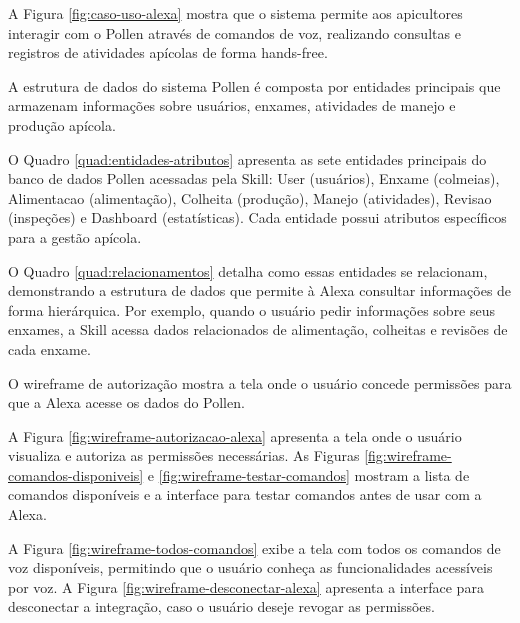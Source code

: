 

A Figura \ref{fig:caso-uso-alexa} mostra que o sistema permite aos apicultores interagir com o Pollen através de comandos de voz, realizando consultas e registros de atividades apícolas de forma hands-free.


A estrutura de dados do sistema Pollen é composta por entidades principais que armazenam informações sobre usuários, enxames, atividades de manejo e produção apícola.



O Quadro \ref{quad:entidades-atributos} apresenta as sete entidades principais do banco de dados Pollen acessadas pela Skill: User (usuários), Enxame (colmeias), Alimentacao (alimentação), Colheita (produção), Manejo (atividades), Revisao (inspeções) e Dashboard (estatísticas). Cada entidade possui atributos específicos para a gestão apícola.

O Quadro \ref{quad:relacionamentos} detalha como essas entidades se relacionam, demonstrando a estrutura de dados que permite à Alexa consultar informações de forma hierárquica. Por exemplo, quando o usuário pedir informações sobre seus enxames, a Skill acessa dados relacionados de alimentação, colheitas e revisões de cada enxame.

\label{sec:interfaces-sistema}


O wireframe de autorização mostra a tela onde o usuário concede permissões para que a Alexa acesse os dados do Pollen.



A Figura \ref{fig:wireframe-autorizacao-alexa} apresenta a tela onde o usuário visualiza e autoriza as permissões necessárias. As Figuras \ref{fig:wireframe-comandos-disponiveis} e \ref{fig:wireframe-testar-comandos} mostram a lista de comandos disponíveis e a interface para testar comandos antes de usar com a Alexa.




A Figura \ref{fig:wireframe-todos-comandos} exibe a tela com todos os comandos de voz disponíveis, permitindo que o usuário conheça as funcionalidades acessíveis por voz. A Figura \ref{fig:wireframe-desconectar-alexa} apresenta a interface para desconectar a integração, caso o usuário deseje revogar as permissões.

